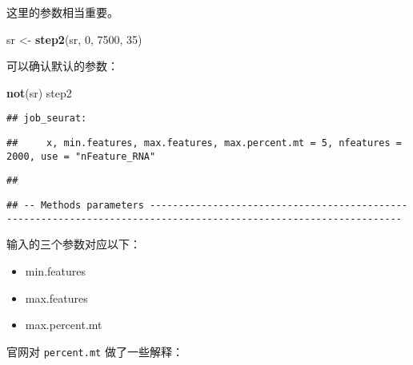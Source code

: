 \documentclass[
]{article}
\newenvironment{Shaded}{\begin{snugshade}}{\end{snugshade}}
\newcommand{\DecValTok}[1]{\textcolor[rgb]{0.00,0.00,0.81}{#1}}
\newcommand{\KeywordTok}[1]{\textcolor[rgb]{0.13,0.29,0.53}{\textbf{#1}}}
\newcommand{\NormalTok}[1]{#1}
\newcommand{\StringTok}[1]{\textcolor[rgb]{0.31,0.60,0.02}{#1}}
\providecommand{\tightlist}{%
  \setlength{\itemsep}{0pt}\setlength{\parskip}{0pt}}
\begin{document}
这里的参数相当重要。

\begin{Shaded}
\begin{Highlighting}[]
\NormalTok{sr \textless{}{-}}\StringTok{ }\KeywordTok{step2}\NormalTok{(sr, }\DecValTok{0}\NormalTok{, }\DecValTok{7500}\NormalTok{, }\DecValTok{35}\NormalTok{)}
\end{Highlighting}
\end{Shaded}

可以确认默认的参数：

\begin{Shaded}
\begin{Highlighting}[]
\KeywordTok{not}\NormalTok{(sr)}
\NormalTok{step2}
\end{Highlighting}
\end{Shaded}

\begin{verbatim}
## job_seurat:
\end{verbatim}

\begin{verbatim}
##     x, min.features, max.features, max.percent.mt = 5, nfeatures = 2000, use = "nFeature_RNA"
\end{verbatim}

\begin{verbatim}
## 
\end{verbatim}

\begin{verbatim}
## -- Methods parameters ------------------------------------------------------------------------------------------------------------------
\end{verbatim}

输入的三个参数对应以下：

\begin{itemize}
\tightlist
\item
  min.features
\item
  max.features
\item
  max.percent.mt
\end{itemize}

官网对 \texttt{percent.mt} 做了一些解释：
\end{document}
